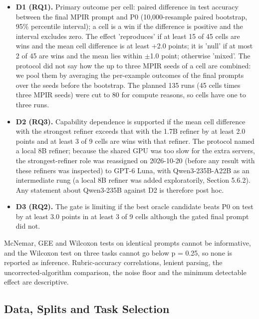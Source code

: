 \documentclass{ieeeaccess}
\begin{document}
\begin{itemize}
\item \textbf{D1 (RQ1).} Primary outcome per cell: paired difference in test accuracy between the final MPIR prompt and P0 (10,000-resample paired bootstrap, 95\% percentile interval); a cell is a win if the difference is positive and the interval excludes zero. The effect 'reproduces' if at least 15 of 45 cells are wins and the mean cell difference is at least +2.0 points; it is 'null' if at most 2 of 45 are wins and the mean lies within $\pm$1.0 point; otherwise 'mixed'. The protocol did not say how the up to three MPIR seeds of a cell are combined: we pool them by averaging the per-example outcomes of the final prompts over the seeds before the bootstrap. The planned 135 runs (45 cells times three MPIR seeds) were cut to 80 for compute reasons, so cells have one to three runs.
\item \textbf{D2 (RQ3).} Capability dependence is supported if the mean cell difference with the strongest refiner exceeds that with the 1.7B refiner by at least 2.0 points and at least 3 of 9 cells are wins with that refiner. The protocol named a local 8B refiner; because the shared GPU was too slow for the extra servers, the strongest-refiner role was reassigned on 2026-10-20 (before any result with these refiners was inspected) to GPT-6 Luna, with Qwen3-235B-A22B as an intermediate rung (a local 8B refiner was added exploratorily, Section 5.6.2). Any statement about Qwen3-235B against D2 is therefore post hoc.
\item \textbf{D3 (RQ2).} The gate is limiting if the best oracle candidate beats P0 on test by at least 3.0 points in at least 3 of 9 cells although the gated final prompt did not.
\end{itemize}

McNemar, GEE and Wilcoxon tests on identical prompts cannot be informative, and the Wilcoxon test on three tasks cannot go below p = 0.25, so none is reported as inference. Rubric-accuracy correlations, lenient parsing, the uncorrected-algorithm comparison, the noise floor and the minimum detectable effect are descriptive.

\subsection{Data, Splits and Task Selection}
\end{document}
